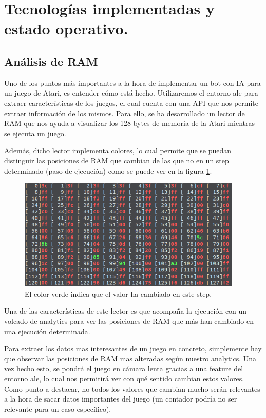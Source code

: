 \section{Tecnologías implementadas y estado operativo.}
\subsection{Análisis de RAM}
\label{subsec:ramanalisi}
Uno de los puntos más importantes a la hora de implementar un bot con IA para un juego de Atari, es entender cómo está hecho. Utilizaremos el entorno \ac{ale} para extraer características de los juegos, el cual cuenta con una API que nos permite extraer información de los mismos. Para ello, se ha desarrollado un lector de RAM que nos ayuda a visualizar los 128 bytes de memoria de la Atari mientras se ejecuta un juego.

Además, dicho lector implementa colores, lo cual permite que se puedan distinguir las posiciones de RAM que cambian de las que no en un step determinado (paso de ejecución)  como se puede ver en la figura \ref{fig:RAM_Colors}.

\begin{figure}[h]
	\centering
	\includegraphics[width=0.95\textwidth]{Figures/RAMColors}
	\caption{El color verde indica que el valor ha cambiado en este step.}
	\label{fig:RAM_Colors}
\end{figure}

Una de las características de este lector es que acompaña la ejecución con un volcado de analytics para ver las posiciones de RAM que más han cambiado en una ejecución determinada.

Para extraer los datos mas interesantes de un juego en concreto, simplemente hay que observar las posiciones de RAM mas alteradas según nuestro analytics. Una vez hecho esto, se pondrá el juego en cámara lenta gracias a una feature del entorno \ac{ale}, lo cual nos permitirá ver con qué sentido cambian estos valores. Como punto a destacar, no todos los valores que cambian mucho serán relevantes a la hora de sacar datos importantes del juego (un contador podría no ser relevante para un caso específico).

